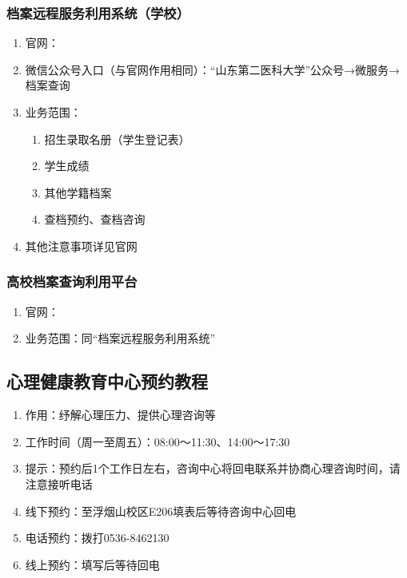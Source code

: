 \subsubsection[档案远程服务利用系统（学校）]{档案远程服务利用系统（学校）}
\begin{enumerate}
    \item 官网：
    \item 微信公众号入口（与官网作用相同）：“山东第二医科大学”公众号→微服务→档案查询
    \item 业务范围：
          \begin{enumerate}
              \item 招生录取名册（学生登记表）
              \item 学生成绩
              \item 其他学籍档案
              \item 查档预约、查档咨询
          \end{enumerate}
    \item 其他注意事项详见官网
\end{enumerate}
\subsubsection[高校档案查询利用平台]{高校档案查询利用平台}
\begin{enumerate}
    \item 官网：
    \item 业务范围：同“档案远程服务利用系统”
\end{enumerate}

\subsection[心理健康教育中心预约教程]{心理健康教育中心预约教程}
\begin{enumerate}
    \item 作用：纾解心理压力、提供心理咨询等
    \item 工作时间（周一至周五）：08:00～11:30、14:00～17:30
    \item 提示：预约后1个工作日左右，咨询中心将回电联系并协商心理咨询时间，请注意接听电话
    \item 线下预约：至浮烟山校区E206填表后等待咨询中心回电
    \item 电话预约：拨打0536-8462130
    \item 线上预约：填写后等待回电

\end{enumerate}

